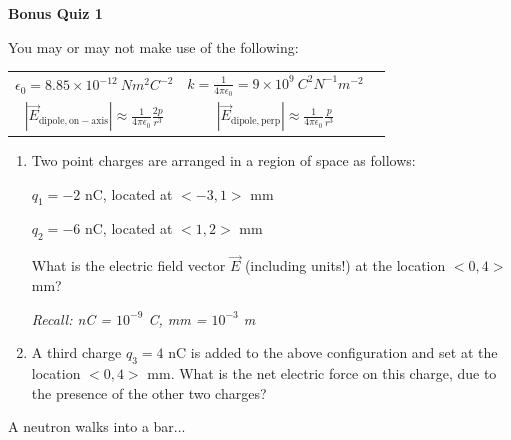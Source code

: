 \documentclass{article}
\begin{document}
\fancyfoot[C]{\thepage}
\vspace*{0cm}
\begin{center}
	{\LARGE \textbf{Bonus Quiz 1}}
\end{center}
You may or may not make use of the following:
\vspace{.5cm}

\renewcommand{\arraystretch}{2}
\begin{tabular}{ccc}
$\epsilon_0=8.85\times10^{-12}\ Nm^2C^{-2}$ & $k=\frac{1}{4\pi\epsilon_0}=9\times10^9\ C^2N^{-1}m^{-2}$\\
$|\vec{E}_\mathrm{dipole,on-axis}| \approx \frac{1}{4\pi\epsilon_0}\frac{2p}{r^3}$ & $|\vec{E}_\mathrm{dipole,perp}| \approx \frac{1}{4\pi\epsilon_0}\frac{p}{r^3}$
\end{tabular}
\begin{enumerate}
\item {
	Two point charges are arranged in a region of space as follows:

$q_1 = -2$ nC, located at $<-3,1>$ mm

$q_2 = -6$ nC, located at $<1, 2>$ mm

What is the electric field vector $\vec{E}$ (including units!) at the location $<0,4>$ mm?

\textit{Recall: nC = $10^{-9}$ C, mm = $10^{-3}$ m}
}

\item {
	A third charge $q_3=4$ nC is added to the above configuration and set at the location $<0,4>$ mm. What is the net electric force on this charge, due to the presence of the other two charges?
}
\end{enumerate}

\vspace{16.2cm}
\begin{flushright}
	\color{gray}
	\tiny{A neutron walks into a bar...}
\end{flushright}
\end{document}
